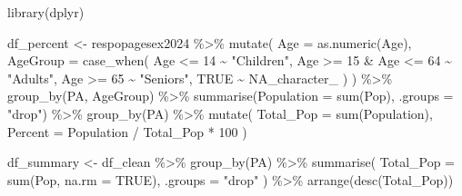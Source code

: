 \documentclass[
  letterpaper,
  DIV=11,
  numbers=noendperiod]{scrartcl}
\newenvironment{Shaded}{\begin{snugshade}}{\end{snugshade}}
\newcommand{\AttributeTok}[1]{\textcolor[rgb]{0.40,0.45,0.13}{#1}}
\newcommand{\ConstantTok}[1]{\textcolor[rgb]{0.56,0.35,0.01}{#1}}
\newcommand{\DecValTok}[1]{\textcolor[rgb]{0.68,0.00,0.00}{#1}}
\newcommand{\FunctionTok}[1]{\textcolor[rgb]{0.28,0.35,0.67}{#1}}
\newcommand{\NormalTok}[1]{\textcolor[rgb]{0.00,0.23,0.31}{#1}}
\newcommand{\OtherTok}[1]{\textcolor[rgb]{0.00,0.23,0.31}{#1}}
\newcommand{\SpecialCharTok}[1]{\textcolor[rgb]{0.37,0.37,0.37}{#1}}
\newcommand{\StringTok}[1]{\textcolor[rgb]{0.13,0.47,0.30}{#1}}
\begin{document}
\begin{Shaded}
\begin{Highlighting}[]
\FunctionTok{library}\NormalTok{(dplyr)}

\NormalTok{df\_percent }\OtherTok{\textless{}{-}}\NormalTok{ respopagesex2024 }\SpecialCharTok{\%\textgreater{}\%}
  \FunctionTok{mutate}\NormalTok{(}
    \AttributeTok{Age =} \FunctionTok{as.numeric}\NormalTok{(Age),}
    \AttributeTok{AgeGroup =} \FunctionTok{case\_when}\NormalTok{(}
\NormalTok{      Age }\SpecialCharTok{\textless{}=} \DecValTok{14} \SpecialCharTok{\textasciitilde{}} \StringTok{"Children"}\NormalTok{,}
\NormalTok{      Age }\SpecialCharTok{\textgreater{}=} \DecValTok{15} \SpecialCharTok{\&}\NormalTok{ Age }\SpecialCharTok{\textless{}=} \DecValTok{64} \SpecialCharTok{\textasciitilde{}} \StringTok{"Adults"}\NormalTok{,}
\NormalTok{      Age }\SpecialCharTok{\textgreater{}=} \DecValTok{65} \SpecialCharTok{\textasciitilde{}} \StringTok{"Seniors"}\NormalTok{,}
      \ConstantTok{TRUE} \SpecialCharTok{\textasciitilde{}} \ConstantTok{NA\_character\_}
\NormalTok{    )}
\NormalTok{  ) }\SpecialCharTok{\%\textgreater{}\%}
  \FunctionTok{group\_by}\NormalTok{(PA, AgeGroup) }\SpecialCharTok{\%\textgreater{}\%}
  \FunctionTok{summarise}\NormalTok{(}\AttributeTok{Population =} \FunctionTok{sum}\NormalTok{(Pop), }\AttributeTok{.groups =} \StringTok{"drop"}\NormalTok{) }\SpecialCharTok{\%\textgreater{}\%}
  \FunctionTok{group\_by}\NormalTok{(PA) }\SpecialCharTok{\%\textgreater{}\%}
  \FunctionTok{mutate}\NormalTok{(}
    \AttributeTok{Total\_Pop =} \FunctionTok{sum}\NormalTok{(Population),}
    \AttributeTok{Percent =}\NormalTok{ Population }\SpecialCharTok{/}\NormalTok{ Total\_Pop }\SpecialCharTok{*} \DecValTok{100}
\NormalTok{  )}
\end{Highlighting}
\end{Shaded}

\begin{Shaded}
\begin{Highlighting}[]
\NormalTok{df\_summary }\OtherTok{\textless{}{-}}\NormalTok{ df\_clean }\SpecialCharTok{\%\textgreater{}\%}
  \FunctionTok{group\_by}\NormalTok{(PA) }\SpecialCharTok{\%\textgreater{}\%}
  \FunctionTok{summarise}\NormalTok{(}
    \AttributeTok{Total\_Pop =} \FunctionTok{sum}\NormalTok{(Pop, }\AttributeTok{na.rm =} \ConstantTok{TRUE}\NormalTok{),}
    \AttributeTok{.groups =} \StringTok{"drop"}
\NormalTok{  ) }\SpecialCharTok{\%\textgreater{}\%}
  \FunctionTok{arrange}\NormalTok{(}\FunctionTok{desc}\NormalTok{(Total\_Pop))}
\end{Highlighting}
\end{Shaded}
\end{document}
